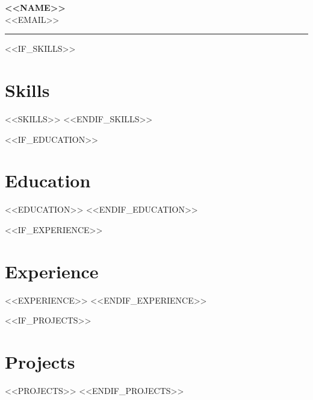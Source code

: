 \documentclass{article}
\begin{document}
\begin{center}
\Huge\textbf{<<NAME>>}\\
\normalsize <<EMAIL>>
\end{center}
\hrule
\vspace{1em}

<<IF_SKILLS>>
\section*{Skills}
<<SKILLS>>
<<ENDIF_SKILLS>>

<<IF_EDUCATION>>
\section*{Education}
<<EDUCATION>>
<<ENDIF_EDUCATION>>

<<IF_EXPERIENCE>>
\section*{Experience}
<<EXPERIENCE>>
<<ENDIF_EXPERIENCE>>

<<IF_PROJECTS>>
\section*{Projects}
<<PROJECTS>>
<<ENDIF_PROJECTS>>
\end{document}

